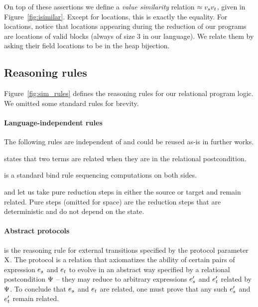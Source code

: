 

On top of these assertions we define a \emph{value similarity} relation $\iSimilar {\datalangVal_s}{\datalangVal_t}$, given in Figure~\ref{fig:isimilar}.  Except for locations, this is exactly the equality. For locations, notice that locations appearing during the reduction of our programs are locations of valid blocks (always of size 3 in our language). We relate them by asking their field locations to be in the heap bijection.

\subsection{Reasoning rules}



Figure~\ref{fig:sim_rules} defines the reasoning rules for our relational program logic. We omitted some standard rules for brevity.

\paragraph{Language-independent rules} The following rules are
independent of \DataLang and could be reused as-is in further works.

 states that two terms are related when they are in the relational postcondition.

 is a standard bind rule sequencing computations on both sides.

 and  let us take pure reduction steps in either the source or target and remain related. Pure steps (omitted for space) are the reduction steps that are deterministic and do not depend on the state.

\paragraph{Abstract protocols}
 is the reasoning rule for external transitions specified by the protocol parameter $\mathrm{X}$. The protocol is a relation that axiomatizes the ability of certain pairs of expression $\datalangExpr_s$ and $\datalangExpr_t$ to evolve in an abstract way specified by a relational postcondition $\Psi$ -- they may reduce to arbitrary expressions $\datalangExpr_s'$ and $\datalangExpr_t'$ related by $\Psi$. To conclude that $\datalangExpr_s$ and $\datalangExpr_t$ are related, one must prove that any such $\datalangExpr_s'$ and $\datalangExpr_t'$ remain related.

